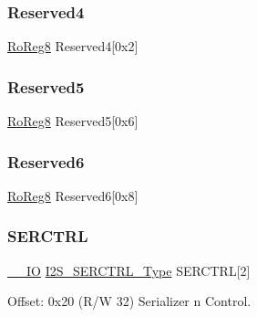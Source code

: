 \mbox{\label{struct_i2s_aec3221203f6f367a8473128fc2f5429e}} 
\subsubsection{\texorpdfstring{Reserved4}{Reserved4}}
{\footnotesize\ttfamily \mbox{\hyperlink{group___s_a_m_d21_e15_a__definitions_ga0d957f1433aaf5d70e4dc2b68288442d}{Ro\+Reg8}} Reserved4\mbox{[}0x2\mbox{]}}

\mbox{\label{struct_i2s_a100f86a70e5c7d2c1cdf836d1836e248}} 
\subsubsection{\texorpdfstring{Reserved5}{Reserved5}}
{\footnotesize\ttfamily \mbox{\hyperlink{group___s_a_m_d21_e15_a__definitions_ga0d957f1433aaf5d70e4dc2b68288442d}{Ro\+Reg8}} Reserved5\mbox{[}0x6\mbox{]}}

\mbox{\label{struct_i2s_a6c79c87b5bf6d0b4a196f3f6840b82e5}} 
\subsubsection{\texorpdfstring{Reserved6}{Reserved6}}
{\footnotesize\ttfamily \mbox{\hyperlink{group___s_a_m_d21_e15_a__definitions_ga0d957f1433aaf5d70e4dc2b68288442d}{Ro\+Reg8}} Reserved6\mbox{[}0x8\mbox{]}}

\mbox{\label{struct_i2s_ab2021825517d38ba0c26ce1de9efc66b}} 
\subsubsection{\texorpdfstring{SERCTRL}{SERCTRL}}
{\footnotesize\ttfamily \mbox{\hyperlink{core__cm0plus_8h_aec43007d9998a0a0e01faede4133d6be}{\+\_\+\+\_\+\+IO}} \mbox{\hyperlink{union_i2_s___s_e_r_c_t_r_l___type}{I2\+S\+\_\+\+S\+E\+R\+C\+T\+R\+L\+\_\+\+Type}} S\+E\+R\+C\+T\+RL\mbox{[}2\mbox{]}}



Offset\+: 0x20 (R/W 32) Serializer n Control. 

